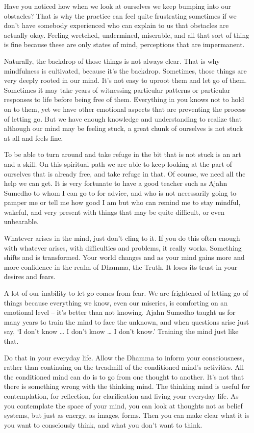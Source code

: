 Have you noticed how when we look at ourselves we keep bumping into our obstacles? That is why the practice can feel quite frustrating sometimes if we don't have somebody experienced who can explain to us that obstacles are actually okay. Feeling wretched, undermined, miserable, and all that sort of thing is fine because these are only states of mind, perceptions that are impermanent. 

Naturally, the backdrop of those things is not always clear. That is why mindfulness is cultivated, because it's the backdrop. Sometimes, those things are very deeply rooted in our mind. It's not easy to uproot them and let go of them. Sometimes it may take years of witnessing particular patterns or particular responses to life before being free of them. Everything in you knows not to hold on to them, yet we have other emotional aspects that are preventing the process of letting go. But we have enough knowledge and understanding to realize that although our mind may be feeling stuck, a great chunk of ourselves is not stuck at all and feels fine. 

To be able to turn around and take refuge in the bit that is not stuck is an art and a skill. On this spiritual path we are able to keep looking at the part of ourselves that is already free, and take refuge in that. Of course, we need all the help we can get. It is very fortunate to have a good teacher such as Ajahn Sumedho to whom I can go to for advice, and who is not necessarily going to pamper me or tell me how good I am but who can remind me to stay mindful, wakeful, and very present with things that may be quite difficult, or even unbearable. 

Whatever arises in the mind, just don't cling to it. If you do this often enough with whatever arises, with difficulties and problems, it really works. Something shifts and is transformed. Your world changes and as your mind gains more and more confidence in the realm of Dhamma, the Truth. It loses its trust in your desires and fears.

A lot of our inability to let go comes from fear. We are frightened of letting go of things because everything we know, even our miseries, is comforting on an emotional level -- it's better than not knowing. Ajahn Sumedho taught us for many years to train the mind to face the unknown, and when questions arise just say, `I don't know \ldots{} I don't know \ldots{} I don't know.' Training the mind just like that.

Do that in your everyday life. Allow the Dhamma to inform your consciousness, rather than continuing on the treadmill of the conditioned mind's activities. All the conditioned mind can do is to go from one thought to another. It's not that there is something wrong with the thinking mind. The thinking mind is useful for contemplation, for reflection, for clarification and living your everyday life. As you contemplate the space of your mind, you can look at thoughts not as belief systems, but just as energy, as images, forms. Then you can make clear what it is you want to consciously think, and what you don't want to think. 

